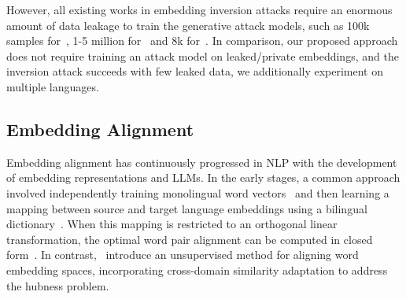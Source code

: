 However, all existing works in embedding inversion attacks require an enormous amount of data leakage to train the generative attack models, such as 100k samples for~\citet{li-etal-2023-sentence}, 1-5 million for~\citet{morris2023text, chen2024typ,chen2024text} and 8k for~\citet{huang_transferable_2024}.
In comparison, our proposed approach \textbf{\ourmethod} does not require training an attack model on leaked/private embeddings, and the inversion attack succeeds with few leaked data, we additionally experiment on multiple languages.




\subsection{Embedding Alignment}
Embedding alignment has continuously progressed in NLP with the development of embedding representations and LLMs.
In the early stages, a common approach involved independently training monolingual word vectors~\citep{10.5555/2999792.2999959} and then learning a mapping between source and target language embeddings using a bilingual dictionary~\citep{mikolov2013exploiting,smith2017offline,artetxe-etal-2017-learning}. 
When this mapping is restricted to an orthogonal linear transformation, the optimal word pair alignment can be computed in closed form~\citep{artetxe-etal-2016-learning,schonemann1966generalized}. 
In contrast,~\citet{lample2018word} introduce an unsupervised method for aligning word embedding spaces, incorporating cross-domain similarity adaptation to address the hubness problem.

